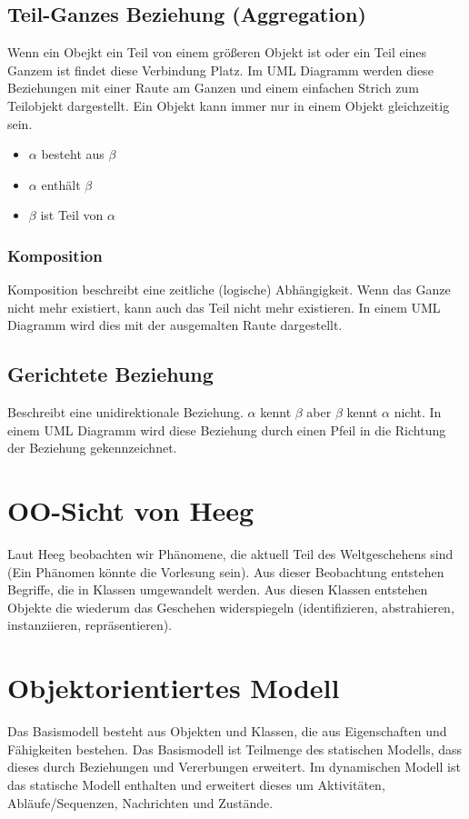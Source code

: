 \subsection{Teil-Ganzes Beziehung (Aggregation)}
Wenn ein Obejkt ein Teil von einem größeren Objekt ist oder ein Teil eines Ganzem ist findet diese Verbindung Platz. Im UML Diagramm werden diese Beziehungen mit einer Raute am Ganzen und einem einfachen Strich zum Teilobjekt dargestellt. Ein Objekt kann immer nur in einem Objekt gleichzeitig sein.
\begin{itemize}
	\item $ \alpha $ besteht aus  $ \beta $
	\item $ \alpha $ enthält $ \beta $
	\item $ \beta $ ist Teil von  $ \alpha $
\end{itemize}

\subsubsection{Komposition}
Komposition beschreibt eine zeitliche (logische) Abhängigkeit. Wenn das Ganze nicht mehr existiert, kann auch das Teil nicht mehr existieren. In einem UML Diagramm wird dies mit der ausgemalten Raute dargestellt.

\subsection{Gerichtete Beziehung}
Beschreibt eine unidirektionale Beziehung. $ \alpha $ kennt $ \beta $ aber $ \beta $ kennt $ \alpha $ nicht. In einem UML Diagramm wird diese Beziehung durch einen Pfeil in die Richtung der Beziehung gekennzeichnet.

\section{OO-Sicht von Heeg}
Laut Heeg beobachten wir Phänomene, die aktuell Teil des Weltgeschehens sind (Ein Phänomen könnte die Vorlesung sein). Aus dieser Beobachtung entstehen Begriffe, die in Klassen umgewandelt werden. Aus diesen Klassen entstehen Objekte die wiederum das Geschehen widerspiegeln (identifizieren, abstrahieren, instanziieren, repräsentieren).

\section{Objektorientiertes Modell}
Das Basismodell besteht aus Objekten und Klassen, die aus Eigenschaften und Fähigkeiten bestehen. Das Basismodell ist Teilmenge des statischen Modells, dass dieses durch Beziehungen und Vererbungen erweitert. Im dynamischen Modell ist das statische Modell enthalten und erweitert dieses um Aktivitäten, Abläufe/Sequenzen, Nachrichten und Zustände.